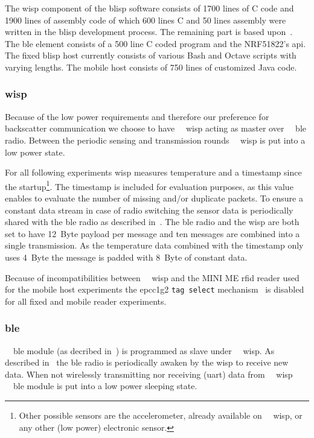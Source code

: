 \documentclass[conference,letterpaper,twoside,final,10pt]{IEEEtran}
\begin{document}
The \ac{wisp} component of the \ac{blisp} software consists of 1700 lines of C code and 1900 lines of assembly code of which 600 lines C and 50 lines assembly were written in the \ac{blisp} development process. The remaining part is based upon~\cite{github2015wisp5}.
The \ac{ble} element consists of a 500 line C coded program and the NRF51822's \ac{api}.
The fixed \ac{blisp} host currently consists of various Bash and Octave scripts with varying lengths.
The mobile host consists of 750 lines of customized Java code.

\subsubsection{\acl{wisp}}
\label{sec:software/wisp}

Because of the low power requirements and therefore our preference for backscatter communication we choose to have {~~}\ac{wisp} acting as master over {~~}\ac{ble} radio.
Between the periodic sensing and transmission rounds {~~}\ac{wisp} is put into a low power state.

For all following experiments \ac{wisp} measures temperature and a timestamp since the startup\footnote{Other possible sensors are the accelerometer, already available on {~~}\ac{wisp}, or any other (low power) electronic sensor.}.
The timestamp is included for evaluation purposes, as this value enables to evaluate the number of missing and/or duplicate packets.
To ensure a constant data stream in case of radio switching the sensor data is periodically shared with the \ac{ble} radio as described in~.
The \ac{ble} radio and the \ac{wisp} are both set to have \SI{12}{Byte} payload per message and ten messages are combined into a single transmission.
As the temperature data combined with the timestamp only uses \SI{4}{Byte} the message is padded with \SI{8}{Byte} of constant data.

Because of incompatibilities between {~~}\ac{wisp} and the MINI ME \ac{rfid} reader used for the mobile host experiments the \ac{epcc1g2} \texttt{tag select} mechanism~\cite[Sec. 6.3.2.3]{epcglobal2013gen2} is disabled for all fixed and mobile reader experiments.

\subsubsection{\acl{ble}}
\label{sec:software/ble}

{~~}\ac{ble} module (as decribed in~) is programmed as slave under {~~}\ac{wisp}.
As described in~ the \ac{ble} radio is periodically awaken by the \ac{wisp} to receive new data.
When not wirelessly transmitting nor receiving (\ac{uart}) data from {~~}\ac{wisp} {~~}\ac{ble} module is put into a low power sleeping state.
\end{document}
